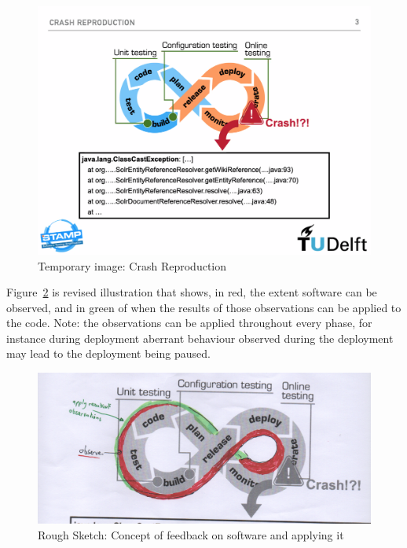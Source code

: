 \begin{figure}[ht!]
    \centering
    \includegraphics[width=14cm]{images/icst-2020/crash-reproduction-icst2020.png}
    \caption{Temporary image: Crash Reproduction}
    \label{fig:crash-reproduction-icst2020}
\end{figure}

Figure~\ref{fig:oberve-and-apply-devops-loop} is revised illustration that shows, in red, the extent software can be observed, and in green of when the results of those observations can be applied to the code. Note: the observations can be applied throughout every phase, for instance during deployment aberrant behaviour observed during the deployment may lead to the deployment being paused.

\begin{figure}[ht!]
    \centering
    \includegraphics[width=14cm]{images/rough-sketches/hack-of-devops-crash-figure.png}
    \caption{Rough Sketch: Concept of feedback on software and applying it}
    \label{fig:oberve-and-apply-devops-loop}
\end{figure}

